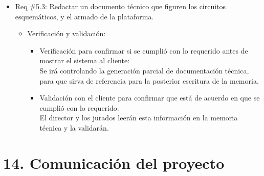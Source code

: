 \documentclass[11pt]{charter}
\begin{document}
\begin{itemize}
\item Req \#5.3: Redactar un documento técnico que figuren los circuitos esquemáticos, y el armado de la plataforma.
\begin{itemize}
\item Verificación y validación:
	\begin{itemize}
	\item Verificación para confirmar si se cumplió con lo requerido 	antes de mostrar el sistema al cliente:\\
	Se irá controlando la generación parcial de documentación
	técnica, para que sirva de referencia para la posterior
	escritura de la memoria.
	\item Validación con el cliente para confirmar que está de 				acuerdo en que se cumplió con lo requerido:\\
	El director y los jurados leerán esta información en la memoria
	técnica y la validarán.   
	\end{itemize}
\end{itemize}
\end{itemize}

\clearpage

\section{14. Comunicación del proyecto}
\label{sec:comunicaciones}


\end{document}
